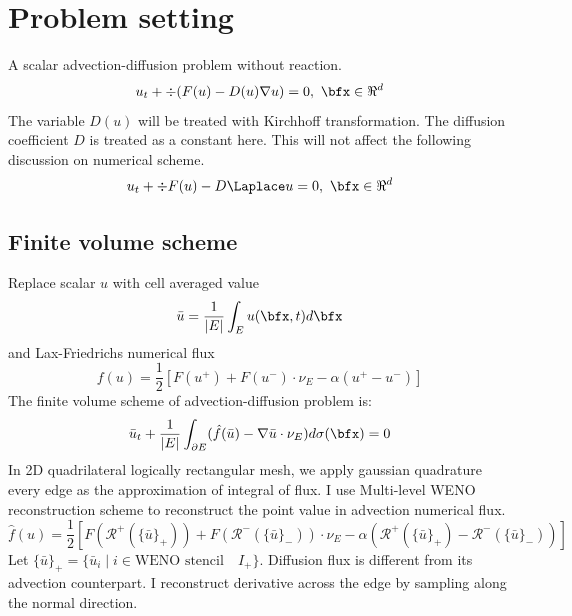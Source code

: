 \section{Problem setting}
A scalar advection-diffusion problem without reaction.
\begin{equation} \label{eq:ad}
		  u_t + \div (F(u) - D(u) \nabla u) = 0, \ \bfx\in\Re^d
\end{equation}
The variable $D(u)$ will be treated with  Kirchhoff transformation.
The diffusion coefficient $D$ is treated as a constant here.
This will not affect the following discussion on numerical scheme.
\begin{equation} \label{eq:sad}
		  u_t + \div F(u) - D\Laplace u = 0, \ \bfx\in\Re^d
\end{equation}
\subsection{Finite volume scheme}
Replace scalar $u$ with cell averaged value 
\begin{equation}\label{eq:cellaveu}
		  \bar u = \frac{1}{|E|} \int_E u(\bfx, t) d\bfx
\end{equation}
and Lax-Friedrichs numerical flux
\begin{equation}\label{eq:lax}
		  f(u) = \frac{1}{2} [F(u^+)  + F(u^-) \cdot \nu_E - \alpha (u^+ - u^-)]
\end{equation}
The finite volume scheme of advection-diffusion problem is:
\begin{equation}\label{eq:fv}
		  \bar u_t + \frac{1}{|E|} \int_{\partial E} (\hat f(\bar u) - \nabla \bar u \cdot \nu_E) d\sigma(\bfx) = 0
\end{equation}
In 2D quadrilateral logically rectangular mesh, 
we apply gaussian quadrature every edge as the approximation of integral of flux. 
I use Multi-level WENO reconstruction scheme to reconstruct the point value in 
advection numerical flux.
\begin{equation}\label{eq:LaxFriedrichs}
		  \hat f(u) = \frac{1}{2} [F(\mathscr{R}^+(\{\bar u\}_+)) + F(\mathscr{R}^-(\{\bar u\}_-))\cdot \nu_E - 
		  \alpha(\mathscr{R}^+(\{\bar u\}_+) - \mathscr{R}^-(\{\bar u\}_-))] 
\end{equation}
Let $\{\bar u\}_+ = \{\bar u_i \mid i \in \text{WENO stencil} \quad I_+ \}$. 
Diffusion flux is different from its advection counterpart.
I reconstruct derivative across the edge by sampling along the normal direction.

